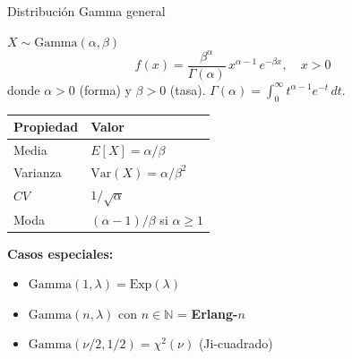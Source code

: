 \documentclass[aspectratio=1610, 9pt]{beamer}
\begin{document}
\begin{frame}{Distribuci\'{o}n Gamma general}

\begin{block}{$X \sim \text{Gamma}(\alpha, \beta)$}
\[
f(x) = \frac{\beta^\alpha}{\Gamma(\alpha)}\, x^{\alpha-1}\, e^{-\beta x}, \quad x > 0
\]
donde $\alpha > 0$ (forma) y $\beta > 0$ (tasa). $\Gamma(\alpha) = \int_0^\infty t^{\alpha-1}e^{-t}\,dt$.
\end{block}

\vspace{0.2cm}
\renewcommand{\arraystretch}{1.4}
\begin{center}
\begin{tabular}{ll}
\toprule
\textbf{Propiedad} & \textbf{Valor} \\
\midrule
Media & $E[X] = \alpha / \beta$ \\
Varianza & $\text{Var}(X) = \alpha / \beta^2$ \\
$CV$ & $1/\sqrt{\alpha}$ \\
Moda & $(\alpha - 1)/\beta$ si $\alpha \geq 1$ \\
\bottomrule
\end{tabular}
\end{center}

\vspace{0.2cm}
\textbf{Casos especiales:}
\begin{itemize}
    \item $\text{Gamma}(1, \lambda) = \text{Exp}(\lambda)$
    \item $\text{Gamma}(n, \lambda)$ con $n \in \mathbb{N}$ = \textbf{Erlang-$n$}
    \item $\text{Gamma}(\nu/2, 1/2) = \chi^2(\nu)$ (Ji-cuadrado)
\end{itemize}
\end{frame}
\end{document}
